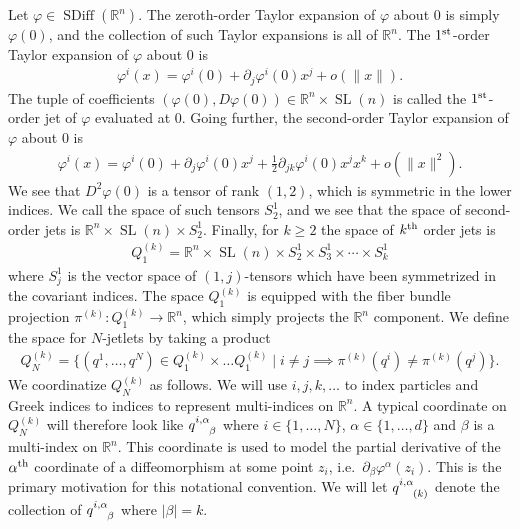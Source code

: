 \documentclass[12pt]{amsart}
\newcommand{\R}{\ensuremath{\mathbb{R}}}
\DeclareMathOperator{\SDiff}{SDiff}
\DeclareMathOperator{\SL}{SL}
\begin{document}
  Let $\varphi \in \SDiff(\R^n)$.
  The zeroth-order Taylor expansion of $\varphi$ about $0$
  is simply $\varphi(0)$, and the collection of such Taylor
  expansions is all of $\R^n$.
  The $1^{\rm st}$-order Taylor expansion of $\varphi$ about $0$ is
  \begin{align*}
    \varphi^i( x) = \varphi^i(0) + \partial_j \varphi^i(0) x^j + o( \|x\|).
  \end{align*}
  The tuple of coefficients $(\varphi(0) , D\varphi(0) ) \in \R^n \times \SL(n)$ is
  called the $1^{\rm st}$-order jet of $\varphi$ evaluated at $0$.
  Going further, the second-order Taylor expansion of $\varphi$ about $0$
  is
  \begin{align*}
    \varphi^i(x) = \varphi^i(0) + \partial_j \varphi^i(0) x^j + 
    \frac{1}{2} \partial_{jk} \varphi^i(0) x^j x^k + o( \| x\|^2).
  \end{align*}
  We see that $D^2\varphi(0)$ is a tensor of rank $(1,2)$, which is
  symmetric in the lower indices.
  We call the space of such tensors $S^1_2$,
  and we see that the space of second-order jets is $\R^n \times \SL(n) \times S^1_2$.
  Finally, for $k \geq 2$ the space of $k^{\rm th}$ order jets is
  \begin{align*}
    Q_1^{(k)} = \R^n \times \SL(n) \times S^1_2 \times S^1_3 \times \cdots\times S^1_k
  \end{align*}
  where $S^1_j$ is the vector space of $(1,j)$-tensors which
  have been symmetrized in the covariant indices.
  The space $Q_1^{(k)}$ is equipped with the fiber bundle
  projection $\pi^{(k)} : Q_1^{(k)} \to \R^n$,
  which simply projects the $\R^n$ component.
  We define the space for $N$-jetlets by taking a product
  \begin{align*}
    Q^{(k)}_N = \{ (q^1,\dots, q^N) \in Q_1^{(k)} \times \dots Q_1^{(k)}
    \mid i \neq j \implies \pi^{(k)}( q^i) \neq \pi^{(k)}( q^j) \}.
  \end{align*}
  We coordinatize $Q^{(k)}_N$ as follows.
  We will use $i,j,k,\dots$ to index particles and Greek indices to indices to represent
  multi-indices on $\R^n$.  A typical coordinate on $Q^{(k)}_N$ will therefore look
  like $q\indices{^{i,\alpha}_{\beta}}$ where $i \in \{1,\dots,N\}$, $\alpha \in \{ 1 , \dots, d \}$
  and $\beta$ is a multi-index on $\R^n$.
  This coordinate is used to model the partial derivative of the $\alpha^{\rm th}$ coordinate
  of a diffeomorphism at some point $z_i$, i.e.\ $\partial_\beta \varphi^\alpha(z_i)$.
  This is the primary motivation for this notational convention.
  We will let $q \indices{^{i,\alpha}_{(k)}}$ denote the collection of $q\indices{^{i,\alpha}_\beta}$
  where $| \beta | = k$.
\end{document}
